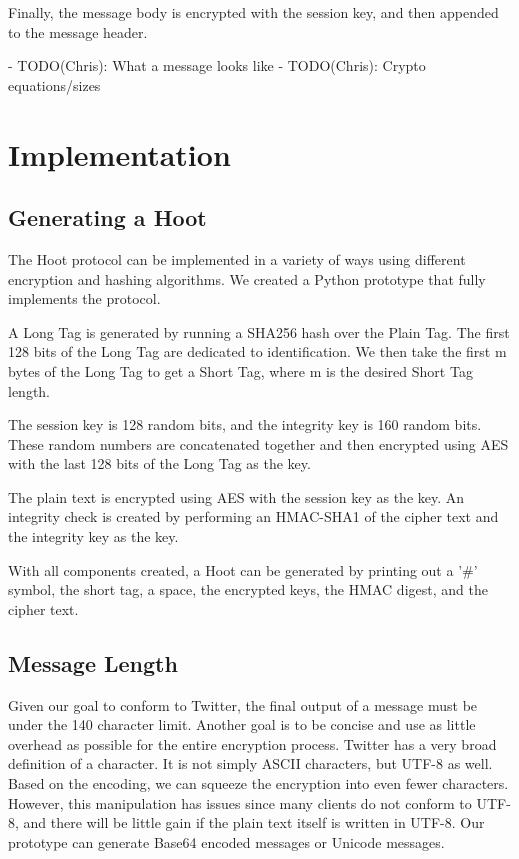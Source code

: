 \documentclass{acm_proc_article-sp}
\begin{document}
Finally, the message body is encrypted with the session key, and then appended to the message header.

- TODO(Chris): What a message looks like
- TODO(Chris): Crypto equations/sizes

\section{Implementation}

\subsection{Generating a Hoot}

The Hoot protocol can be implemented in a variety of ways using different encryption and hashing algorithms. We created a Python prototype that fully implements the protocol.

A Long Tag is generated by running a SHA256 hash over the Plain Tag. The first 128 bits of the Long Tag are dedicated to identification. We then take the first m bytes of the Long Tag to get a Short Tag, where m is the desired Short Tag length.

The session key is 128 random bits, and the integrity key is 160 random bits. These random numbers are concatenated together and then encrypted using AES with the last 128 bits of the Long Tag as the key.

The plain text is encrypted using AES with the session key as the key. An integrity check is created by performing an HMAC-SHA1 of the cipher text and the integrity key as the key.

With all components created, a Hoot can be generated by printing out a '\#' symbol,  the short tag, a space, the encrypted keys, the HMAC digest, and the cipher text.

\subsection{Message Length}

Given our goal to conform to Twitter, the final output of a message must be under the 140 character limit. Another goal is to be concise and use as little overhead as possible for the entire encryption process. Twitter has a very broad definition of a character. It is not simply ASCII characters, but UTF-8 as well. Based on the encoding, we can squeeze the encryption into even fewer characters. However, this manipulation has issues since many clients do not conform to UTF-8, and there will be little gain if the plain text itself is written in UTF-8. Our prototype can generate Base64 encoded messages or Unicode messages.
\end{document}
